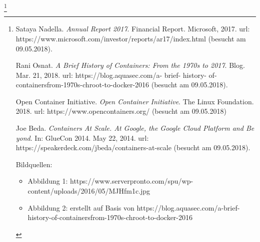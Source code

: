 \let\thefootnote\relax\footnote{
{
\vspace{0.1mm}
\begin{minipage}[t]{\linewidth}
 \flushleft\begin{list}{\textcolor{black}{[]}}{\setlength{\labelwidth}{2cm}\setlength{\leftmargin}{0.5cm}\setlength{\itemsep}{-1mm}}\item Sataya Nadella. \textit{Annual Report 2017}. Financial Report. Microsoft, 2017. url: https://www.microsoft.com/investor/reports/ar17/index.html (besucht am 09.05.2018).
\item Rani Osnat. \textit{A Brief History of Containers: From the 1970s to 2017}. Blog. Mar. 21, 2018. url: https://blog.aquasec.com/a- brief- history- of- containersfrom-1970s-chroot-to-docker-2016 (besucht am 09.05.2018).
\item Open Container Initiative. \textit{Open Container Initiative}. The Linux Foundation. 2018. url: https://www.opencontainers.org/ (besucht am 09.05.2018)
\item Joe Beda. \textit{Containers At Scale. At Google, the Google Cloud Platform and Be
yond}. In: GlueCon 2014. May 22, 2014. url: https://speakerdeck.com/jbeda/containers-at-scale (besucht am 09.05.2018).
\end{list}
Bildquellen:
\begin{itemize}
\item Abbildung 1: https://www.serverpronto.com/spu/wp-content/uploads/2016/05/MJHfm1c.jpg
\item Abbildung 2: erstellt auf Basis von https://blog.aquasec.com/a-brief-history-of-containersfrom-1970s-chroot-to-docker-2016
\end{itemize}
\end{minipage}
}}
\newpage

















